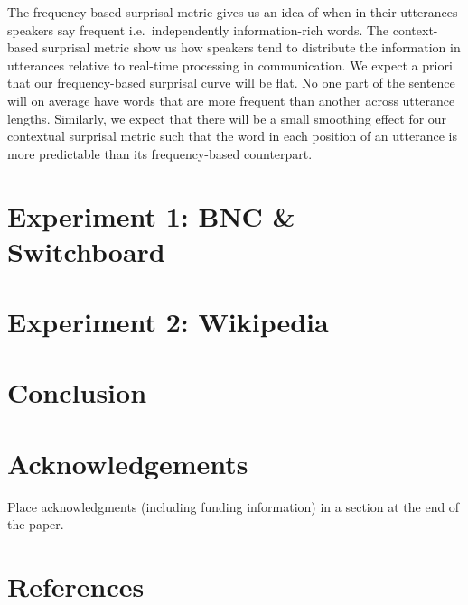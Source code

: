 \documentclass[10pt, letterpaper]{article}
\begin{document}
The frequency-based surprisal metric gives us an idea of when in their
utterances speakers say frequent i.e.~independently information-rich
words. The context-based surprisal metric show us how speakers tend to
distribute the information in utterances relative to real-time
processing in communication. We expect a priori that our frequency-based
surprisal curve will be flat. No one part of the sentence will on
average have words that are more frequent than another across utterance
lengths. Similarly, we expect that there will be a small smoothing
effect for our contextual surprisal metric such that the word in each
position of an utterance is more predictable than its frequency-based
counterpart.

\hypertarget{experiment-1-bnc-switchboard}{%
\section{Experiment 1: BNC \&
Switchboard}\label{experiment-1-bnc-switchboard}}

\hypertarget{experiment-2-wikipedia}{%
\section{Experiment 2: Wikipedia}\label{experiment-2-wikipedia}}

\hypertarget{conclusion}{%
\section{Conclusion}\label{conclusion}}

\hypertarget{acknowledgements}{%
\section{Acknowledgements}\label{acknowledgements}}

Place acknowledgments (including funding information) in a section at
the end of the paper.

\hypertarget{references}{%
\section{References}\label{references}}

\setlength{\parindent}{-0.1in} 
\setlength{\leftskip}{0.125in}

\noindent


\end{document}
